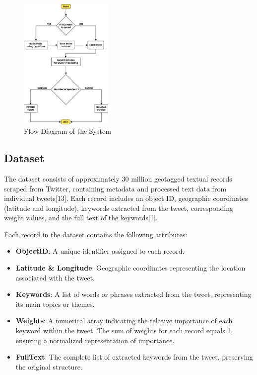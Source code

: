 \documentclass[conference]{IEEEtran}
\begin{document}
\begin{figure}[htbp]
    \centering
    \includegraphics[width=0.40\textwidth]{flow_diagram.jpg}
    \caption{Flow Diagram of the System}
    \label{fig:1}
\end{figure}

\subsection{\textbf{Dataset}}
The dataset consists of approximately 30 million geotagged textual records scraped from Twitter, containing metadata and processed text data from individual tweets[13]. Each record includes an object ID, geographic coordinates (latitude and longitude), keywords extracted from the tweet, corresponding weight values, and the full text of the keywords[1].

Each record in the dataset contains the following attributes:

\begin{itemize}
    \item \textbf{ObjectID}: A unique identifier assigned to each record.
    \item \textbf{Latitude \& Longitude}: Geographic coordinates representing the location associated with the tweet.
    \item \textbf{Keywords}: A list of words or phrases extracted from the tweet, representing its main topics or themes.
    \item \textbf{Weights}: A numerical array indicating the relative importance of each keyword within the tweet. The sum of weights for each record equals 1, ensuring a normalized representation of importance.
    \item \textbf{FullText}: The complete list of extracted keywords from the tweet, preserving the original structure.
\end{itemize}
\end{document}
